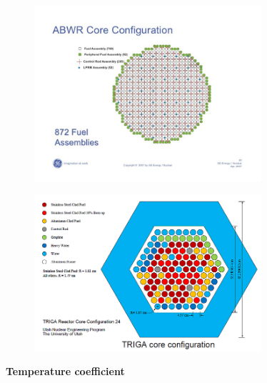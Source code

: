 \documentclass[aspectratio=1610,pdftex,dvipsnames,compress,xcolor={dvipsnames}]{beamer}
\begin{document}
\addtocounter{framenumber}{-1} 
\begin{frame}{}
    \begin{figure}
        \centering
        \includegraphics[width=0.75\textwidth]{abwr.jpg}
    \end{figure}
\end{frame}


\begin{frame}{}
    \begin{figure}
        \centering
        \includegraphics[width=0.75\textwidth]{triga.jpg}
    \end{figure}
\end{frame}


\begin{frame}[plain]{}
    \centering\LARGE\textbf{Temperature coefficient}
\end{frame}
\end{document}
